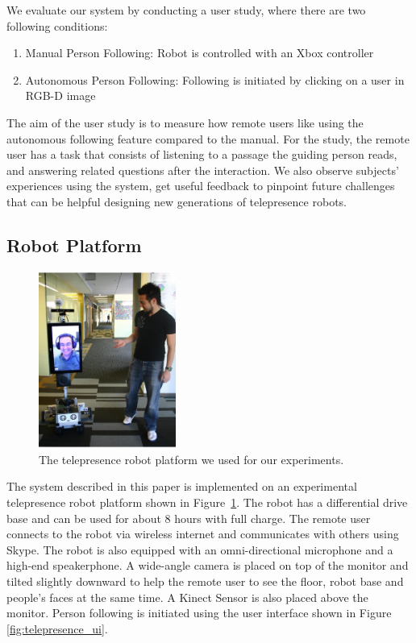 We evaluate our system by conducting a user study, where there are two following conditions:

\begin{enumerate}
\item Manual Person Following: Robot is controlled with an Xbox controller
\item Autonomous Person Following: Following is initiated by clicking on a user in RGB-D image
\end{enumerate}

The aim of the user study is to measure how remote users like using the autonomous following feature compared to the manual. For the study, the remote user has a task that consists of listening to a passage the guiding person reads, and answering related questions after the interaction. We also observe subjects' experiences using the system, get useful feedback to pinpoint future challenges that can be helpful designing new generations of telepresence robots.

\subsection{Robot Platform}

\begin{figure}[h!]
\centering
\includegraphics[width=0.4\textwidth]{pics/telepresence_robot}
\caption{The telepresence robot platform we used for our experiments.}
\label{fig:telepresence_robot}
\end{figure}

The system described in this paper is implemented on an experimental telepresence robot platform shown in Figure~\ref{fig:telepresence_robot}. The robot has a differential drive base and can be used for about 8 hours with full charge. The remote user connects to the robot via wireless internet and communicates with others using Skype. The robot is also equipped with an omni-directional microphone and a high-end speakerphone. A wide-angle camera is placed on top of the monitor and tilted slightly downward to help the remote user to see the floor, robot base and people's faces at the same time. A Kinect Sensor is also placed above the monitor. Person following is initiated using the user interface shown in Figure \ref{fig:telepresence_ui}.

